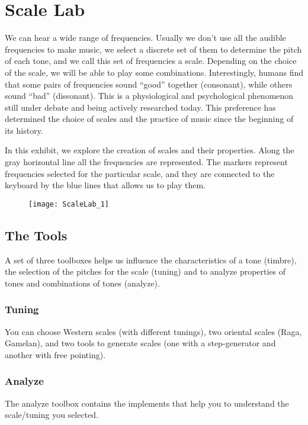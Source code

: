 \section{Scale Lab}
We can hear a wide range of frequencies. Usually we don't use all the audible frequencies to make music, we select a discrete set of them to determine the pitch of each tone, and we call this set of frequencies a scale. Depending on the choice of the scale, we will be able to play some combinations. Interestingly, humans find that some pairs of frequencies sound ``good'' together (consonant), while others sound ``bad'' (dissonant). This is a physiological and psychological phenomenon still under debate and being actively researched today. This preference has determined the choice of scales and the practice of music since the beginning of its history.

In this exhibit, we explore the creation of scales and their properties. Along the gray horizontal line all the frequencies are represented. The markers represent frequencies selected for the particular  scale, and they are connected to the keyboard by the blue lines that allows us to play them. 

\begin{figure}[h]
\centering
\texttt{[image: ScaleLab\_1]}
\end{figure}

\subsection{The Tools}
A set of three toolboxes helps us influence the characteristics of a tone (timbre), the selection of the pitches for the scale (tuning) and to analyze properties of tones and combinations of tones (analyze).

\subsubsection{Tuning}
You can choose Western scales (with different tunings), two oriental scales (Raga, Gamelan), and two tools to generate scales (one with a step-generator and another with free pointing).

\subsubsection{Analyze}
The analyze toolbox contains the implements that help you to understand the scale/tuning you selected.

